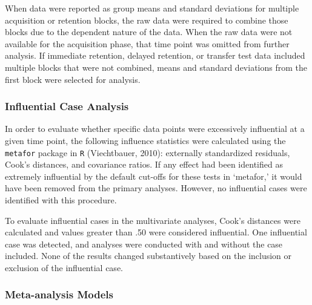 \documentclass[
  english,
  man, donotrepeattitle,floatsintext]{apa7}
\begin{document}
When data were reported as group means and standard deviations for multiple acquisition or retention blocks, the raw data were required to combine those blocks due to the dependent nature of the data. When the raw data were not available for the acquisition phase, that time point was omitted from further analysis. If immediate retention, delayed retention, or transfer test data included multiple blocks that were not combined, means and standard deviations from the first block were selected for analysis.

\hypertarget{influential-case-analysis}{%
\subsubsection{Influential Case Analysis}\label{influential-case-analysis}}

In order to evaluate whether specific data points were excessively influential at a given time point, the following influence statistics were calculated using the \texttt{metafor} package in \texttt{R} (Viechtbauer, 2010): externally standardized residuals, Cook's distances, and covariance ratios. If any effect had been identified as extremely influential by the default cut-offs for these tests in `metafor,' it would have been removed from the primary analyses. However, no influential cases were identified with this procedure.

To evaluate influential cases in the multivariate analyses, Cook's distances were calculated and values greater than .50 were considered influential. One influential case was detected, and analyses were conducted with and without the case included. None of the results changed substantively based on the inclusion or exclusion of the influential case.

\hypertarget{meta-analysis-models}{%
\subsubsection{Meta-analysis Models}\label{meta-analysis-models}}
\end{document}
